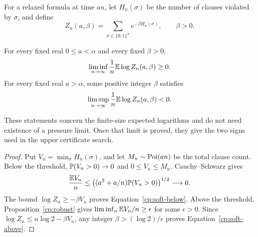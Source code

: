 For a relaxed formula at time $an$, let $H_n(\sigma)$ be the number of
clauses violated by $\sigma$, and define
\[
 Z_n(a,\beta)=\sum_{\sigma\in\{0,1\}^n}
       e^{-\beta H_n(\sigma)},\qquad \beta>0.
\]

\begin{corollary}\label{cp:soft-signs}
For every fixed real $0\le a<\alpha$ and every fixed $\beta>0$,
\begin{equation}\label{cp:soft-below}
 \liminf_{n\to\infty}\frac1n\mathbb E\log Z_n(a,\beta)\ge0.
\end{equation}
For every fixed real $a>\alpha$, some positive integer $\beta$ satisfies
\begin{equation}\label{cp:soft-above}
 \limsup_{n\to\infty}\frac1n\mathbb E\log Z_n(a,\beta)<0.
\end{equation}
\end{corollary}

These statements concern the finite-size expected logarithms and do not
need existence of a pressure limit. Once that limit is proved, they give
the two signs used in the upper certificate search.

\begin{proof}
Put $V_n=\min_\sigma H_n(\sigma)$, and let $M_n\sim\operatorname{Poi}(an)$ be the
total clause count. Below the threshold, $\mathbb P(V_n>0)\to0$ and
$0\le V_n\le M_n$. Cauchy--Schwarz gives
\[
 \frac{\mathbb E V_n}{n}
 \le\bigl((a^2+a/n)\mathbb P(V_n>0)\bigr)^{1/2}\longrightarrow0.
\]
The bound $\log Z_n\ge-\beta V_n$ proves
Equation~\eqref{cp:soft-below}. Above the threshold,
Proposition~\ref{cp:robust} gives $\liminf_n\mathbb E V_n/n\ge\epsilon$
for some $\epsilon>0$. Since
$\log Z_n\le n\log2-\beta V_n$, any integer
$\beta>(\log2)/\epsilon$ proves Equation~\eqref{cp:soft-above}.
\end{proof}
